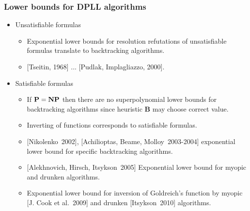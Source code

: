 \begin{frame}
    \frametitle{Lower bounds for DPLL algorithms}

    \pause
	\begin{itemize}
		\item Unsatisfiable formulas
		\begin{itemize}
            \item{} Exponential lower bounds for resolution refutations
				of unsatisfiable formulas translate to backtracking
                algorithms.
			\item{} [Tseitin, 1968] ... [Pudlak, Implagliazzo, 2000].
		\end{itemize}
        \pause
		\item Satisfiable formulas
		\begin{itemize}
			\item If $\bf P = NP$ then there are no superpolynomial
		        lower bounds for backtracking algorithms since
                heuristic $\mathbf{B}$ may choose correct value.
            \pause
			\item Inverting of functions corresponds to satisfiable
		        formulas.
            \pause
            \item{} [Nikolenko~2002], [Achilioptas, Beame, Molloy~2003-2004]
				exponential lower bound for specific backtracking
                algorithms.
            \item{} [Alekhnovich, Hirsch, Itsykson~2005] Exponential lower bound 
				for myopic and drunken algorithms.
            \pause
            \item{}  Exponential lower bound 
		for inversion of Goldreich's function by myopic [J. Cook et al.~2009] 
		and drunken [Itsykson~2010] algorithms.
		\end{itemize}
	\end{itemize}
\end{frame}

